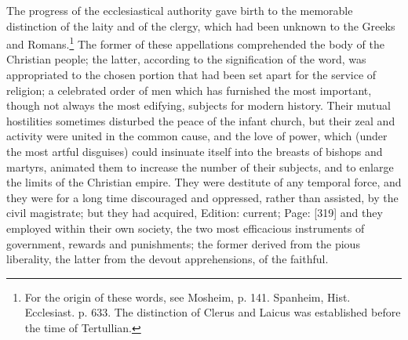 The progress of the ecclesiastical authority gave birth to the memorable distinction of the laity and of the clergy, which had been unknown to the Greeks and Romans.\footnote{For the origin of these words, see Mosheim, p. 141. Spanheim, Hist. Ecclesiast. p. 633. The distinction of Clerus and Laicus was established before the time of Tertullian.} The former of these appellations comprehended the body of the Christian people; the latter, according to the signification of the word, was appropriated to the chosen portion that had been set apart for the service of religion; a celebrated order of men which has furnished the most important, though not always the most edifying, subjects for modern history. Their mutual hostilities sometimes disturbed the peace of the infant church, but their zeal and activity were united in the common cause, and the love of power, which (under the most artful disguises) could insinuate itself into the breasts of bishops and martyrs, animated them to increase the number of their subjects, and to enlarge the limits of the Christian empire. They were destitute of any temporal force, and they were for a long time discouraged and oppressed, rather than assisted, by the civil magistrate; but they had acquired, Edition: current; Page: [319] and they employed within their own society, the two most efficacious instruments of government, rewards and punishments; the former derived from the pious liberality, the latter from the devout apprehensions, of the faithful.

